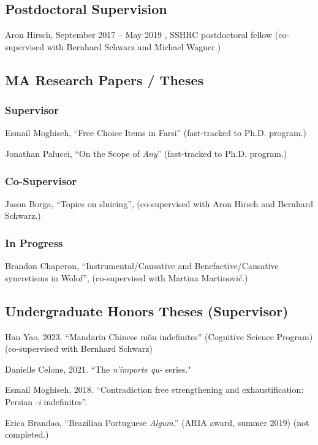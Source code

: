 \documentclass[11pt]{article}
\begin{document}
\subsection*{Postdoctoral Supervision}

Aron Hirsch, September 2017 -- May 2019 , SSHRC postdoctoral fellow (co-supervised with Bernhard Schwarz and Michael Wagner.)

\subsection*{MA Research Papers / Theses}

\subsubsection*{Supervisor}

Esmail Moghiseh, ``Free Choice Items in Farsi'' (fast-tracked to Ph.D. program.)

Jonathan Palucci, ``On the Scope of \textit{Any}'' (fast-tracked to Ph.D. program.)

\subsubsection*{Co-Supervisor}

Jason Borga, ``Topics on sluicing'', (co-supervised with Aron Hirsch and Bernhard Schwarz.)


\subsubsection*{In Progress}

Brandon Chaperon, ``Instrumental/Causative and Benefactive/Causative syncretisms in Wolof'', (co-supervised with Martina Martinovi\'c.)

\subsection*{Undergraduate Honors Theses (Supervisor)}

Han Yao, 2023. ``Mandarin Chinese m\u{o}u indefinites'' (Cognitive Science Program) (co-supervised with Bernhard Schwarz)

Danielle Celone, 2021. ``The \textit{n'importe qu-} series." 

Esmail Moghiseh, 2018. ``Contradiction free strengthening and exhaustification: Persian -\textit{i} indefinites''.

Erica Brandao, ``Brazilian Portuguese \textit{Algum}.'' (ARIA award, summer 2019) (not completed.)
\end{document}
